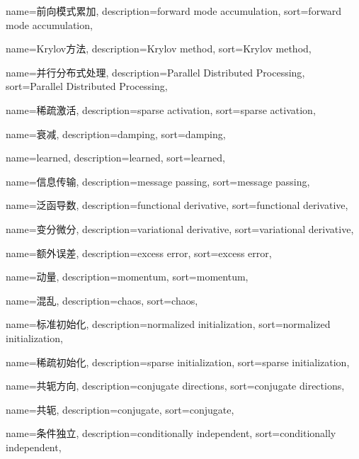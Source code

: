 {
  name=前向模式累加,
  description={forward mode accumulation},
  sort={forward mode accumulation},
}

{
  name=Krylov方法,
  description={Krylov method},
  sort={Krylov method},
}

{
  name=并行分布式处理,
  description={Parallel Distributed Processing},
  sort={Parallel Distributed Processing},
}

{
  name=稀疏激活,
  description={sparse activation},
  sort={sparse activation},
}

{
  name=衰减,
  description={damping},
  sort={damping},
}

{
  name=learned,
  description={learned},
  sort={learned},
}

{
  name=信息传输,
  description={message passing},
  sort={message passing},
}

{
  name=泛函导数,
  description={functional derivative},
  sort={functional derivative},
}

{
  name=变分微分,
  description={variational derivative},
  sort={variational derivative},
}

{
  name=额外误差,
  description={excess error},
  sort={excess error},
}

{
  name=动量,
  description={momentum},
  sort={momentum},
}

{
  name=混乱,
  description={chaos},
  sort={chaos},
}

{
  name=标准初始化,
  description={normalized initialization},
  sort={normalized initialization},
}

{
  name=稀疏初始化,
  description={sparse initialization},
  sort={sparse initialization},
}

{
  name=共轭方向,
  description={conjugate directions},
  sort={conjugate directions},
}

{
  name=共轭,
  description={conjugate},
  sort={conjugate},
}

{
  name=条件独立,
  description={conditionally independent},
  sort={conditionally independent},
}

